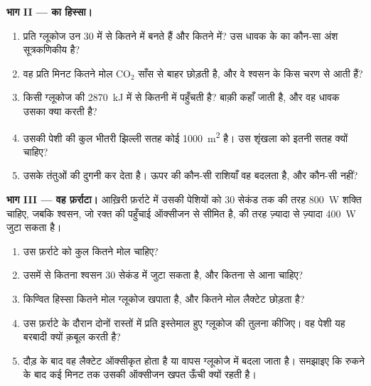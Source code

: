 \begin{problem}
\medskip
\noindent\textbf{भाग II ---  का हिस्सा।}
\begin{enumerate}[resume]
  \item प्रति ग्लूकोज उन 30  में से कितने  में बनते हैं और
        कितने  में? उस धावक के  का कौन-सा अंश सूत्रकणिकीय है?
  \item वह प्रति मिनट कितने मोल $\mathrm{CO_2}$ साँस से बाहर छोड़ती है, और
        वे श्वसन के किस चरण से आती हैं?
  \item किसी ग्लूकोज की \qty{2870}{kJ} में से कितनी  में पहुँचती है?
        बाक़ी कहाँ जाती है, और वह धावक उसका क्या करती है?
  \item उसकी पेशी  की कुल भीतरी झिल्ली सतह कोई \qty{1000}{m^2}
        है। उस शृंखला को इतनी सतह क्यों चाहिए?
  \item {} उसके तंतुओं की  दुगनी कर देता है। ऊपर की
        कौन-सी राशियाँ वह बदलता है, और कौन-सी नहीं?
\end{enumerate}

\medskip
\noindent\textbf{भाग III --- वह फ़र्राटा।}
आख़िरी फ़र्राटे में उसकी पेशियों को 30 सेकंड तक  की तरह \qty{800}{W}
शक्ति चाहिए, जबकि श्वसन, जो रक्त की पहुँचाई ऑक्सीजन से सीमित है,  की तरह
ज़्यादा से ज़्यादा \qty{400}{W} जुटा सकता है।
\begin{enumerate}[resume]
  \item उस फ़र्राटे को कुल कितने मोल  चाहिए?
  \item उसमें से कितना श्वसन 30 सेकंड में जुटा सकता है, और कितना  से
        आना चाहिए?
  \item किण्वित हिस्सा कितने मोल ग्लूकोज खपाता है, और कितने मोल लैक्टेट
        छोड़ता है?
  \item उस फ़र्राटे के दौरान दोनों रास्तों में प्रति  इस्तेमाल हुए
        ग्लूकोज की तुलना कीजिए। वह पेशी यह बरबादी क्यों क़बूल करती है?
  \item दौड़ के बाद वह लैक्टेट ऑक्सीकृत होता है या वापस ग्लूकोज में बदला
        जाता है। समझाइए कि रुकने के बाद कई मिनट तक उसकी ऑक्सीजन खपत ऊँची
        क्यों रहती है।
\end{enumerate}


\end{problem}
